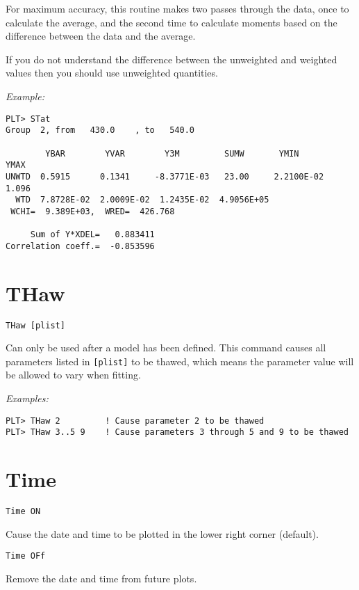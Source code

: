 For maximum accuracy, this routine makes two passes through the data,
once to calculate the average, and the second time to calculate moments
based on the difference between the data and the average.

If you do not understand the difference between the unweighted and
weighted values then you should use unweighted quantities.

\medskip\noindent
{\em Example:}
\begin{verbatim}
PLT> STat
Group  2, from   430.0    , to   540.0

        YBAR        YVAR        Y3M         SUMW       YMIN        YMAX
UNWTD  0.5915      0.1341     -8.3771E-03   23.00     2.2100E-02   1.096
  WTD  7.8728E-02  2.0009E-02  1.2435E-02  4.9056E+05
 WCHI=  9.389E+03,  WRED=  426.768

     Sum of Y*XDEL=   0.883411
Correlation coeff.=  -0.853596
\end{verbatim}

\section*{THaw}
\begin{verbatim}
THaw [plist]
\end{verbatim}
   Can only be used after a model has been defined.  This command
causes all parameters listed in {\tt [plist]} to be thawed, which means
the parameter value will be allowed to vary when fitting.

\medskip\noindent
{\em Examples:}
\begin{verbatim}
PLT> THaw 2         ! Cause parameter 2 to be thawed
PLT> THaw 3..5 9    ! Cause parameters 3 through 5 and 9 to be thawed
\end{verbatim}

\section*{Time}
\begin{verbatim}
Time ON
\end{verbatim}
   Cause the date and time to be plotted in the lower right corner
(default).

\medskip
\begin{verbatim}
Time OFf
\end{verbatim}
   Remove the date and time from future plots.

